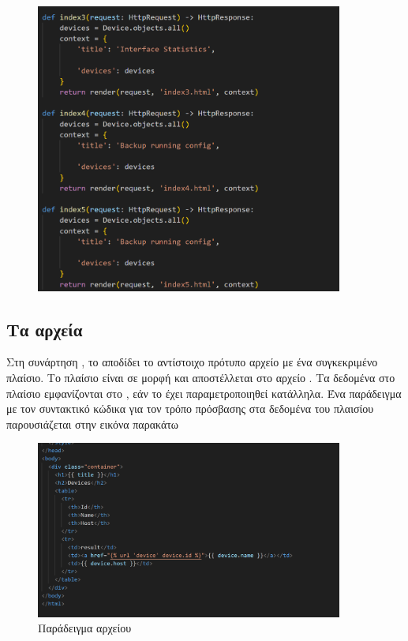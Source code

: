 \begin{figure}[htb]
	\centering
	\includegraphics[width=0.9\textwidth]{graphics/viewspy.png}
	\caption{ }
\end{figure}

\subsection{Τα αρχεία }

Στη συνάρτηση , το  αποδίδει το αντίστοιχο πρότυπο 
αρχείο με ένα συγκεκριμένο πλαίσιο. Το πλαίσιο είναι σε μορφή  και αποστέλλεται στο αρχείο . Τα δεδομένα στο πλαίσιο εμφανίζονται
στο , εάν το  έχει παραμετροποιηθεί κατάλληλα. Ένα παράδειγμα  με
τον συντακτικό κώδικα για τον τρόπο πρόσβασης στα δεδομένα του πλαισίου παρουσιάζεται στην εικόνα παρακάτω



\begin{figure}[htb]
	\centering
	\includegraphics[width=0.9\textwidth]{graphics/html_template.png}
	\caption{Παράδειγμα  αρχείου }
\end{figure}






